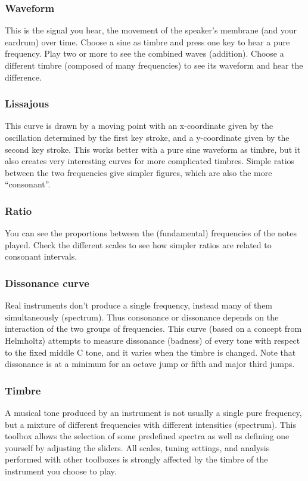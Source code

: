 \subsubsection{Waveform}
This is the signal you hear, the movement of the speaker's membrane (and your eardrum) over time. Choose a sine as timbre and press one key to hear a pure frequency. Play two or more to see the combined waves (addition). Choose a different timbre (composed of many frequencies) to see its waveform and hear the difference.

\subsubsection{Lissajous} 
This curve is drawn by a moving point with an x-coordinate given by the oscillation determined by the first key stroke, and a y-coordinate given by the second key stroke. This works better with a pure sine waveform as timbre, but it also creates very interesting curves for more complicated timbres. Simple ratios between the two frequencies give simpler figures, which are also the more ``consonant''.

\subsubsection{Ratio}
You can see the proportions between the (fundamental) frequencies of the notes played. Check the different scales to see how simpler ratios are related to consonant intervals.

\subsubsection{Dissonance curve}
Real instruments don't produce a single frequency, instead many of them simultaneously (spectrum). Thus consonance or dissonance depends on the interaction of the two groups of frequencies. This curve (based on a concept from Helmholtz) attempts to measure dissonance (badness) of every tone with respect to the fixed middle C tone, and it varies when the timbre is changed. Note that dissonance is at a minimum for an octave jump or fifth and major third jumps.

\subsubsection{Timbre}
A musical tone produced by an instrument is not usually a single pure frequency, but a mixture of different frequencies with different intensities (spectrum). This toolbox allows the selection of  some predefined spectra as well as defining one yourself by adjusting the sliders. All scales, tuning settings, and analysis performed with other toolboxes is strongly affected by the timbre of the instrument you choose to play.

